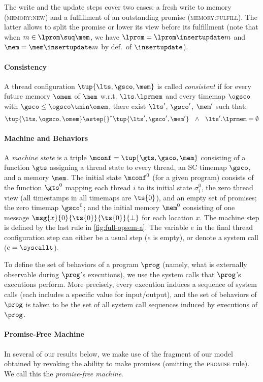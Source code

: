 The write and the update steps cover two cases: a fresh write to memory (\textsc{memory:new}) and a fulfillment of an outstanding promise (\textsc{memory:fulfill}).
The latter allows to split the promise or lower its view before its fulfillment 
(note that when $m\in \lprom \suq \mem$, we have  
$\lprom=\lprom \insertupdate m$
and 
$\mem=\mem \insertupdate m$ by def.\ of $\insertupdate$).

\paragraph{Consistency}
A {thread configuration} $\tup{\lts,\gsco,\mem}$ is called \emph{consistent} if
for every future memory $\omem$ of $\mem$ w.r.t. $\lts.\lprmem$
and every timemap $\ogsco$ with ${\gsco \leq \ogsco \tmin \omem}$,
there exist $\lts'$, $\gsco'$, $\mem'$ such that:
\[
\tup{\lts,\ogsco,\omem} \astep{}^* \tup{\lts',\gsco',\mem'}
~~\land~~ \lts'.\lprmem = \emptyset
\]

\paragraph{Machine and Behaviors}

A \emph{machine state} is a triple $\mconf = \tup{\gts,\gsco,\mem}$ consisting of a
function $\gts$ assigning a thread state to every thread, an SC timemap $\gsco$, and a memory $\mem$.  
The initial state $\mconf^0$ (for a given program) consists of 
the function $\gts^0$ mapping each thread $i$ to its initial state $\sigma_i^0$,
the zero thread view (all timestamps in all timemaps are $\ts{0}$),
and an empty set of promises;
the zero timemap $\gsco^0$;
and the initial memory $\mem^0$ consisting of one message $\msg{x}{0}{\ts{0}}{\ts{0}}{\bot}$ for each location $x$.
The machine step is defined by the last rule in \cref{fig:full-opsem-a}.
The variable $e$ in the final thread configuration step can either be a usual step ($e$ is empty),
or denote a system call ($e=\syscallt$).

To define the set of behaviors of a program $\prog$ 
(namely, what is externally observable during $\prog$'s executions), 
we use the system calls that $\prog$'s executions perform.
More precisely, every execution induces a sequence of system calls 
(each includes a specific value for input/output),
and the set of behaviors of $\prog$ is taken to be the set of all system call sequences induced by executions of $\prog$.

\paragraph{Promise-Free Machine}
In several of our results below, we make use of the fragment of our
model obtained by revoking the ability to make promises (\ie omitting
the \textsc{promise} rule).  We call this the \emph{promise-free
  machine}.




